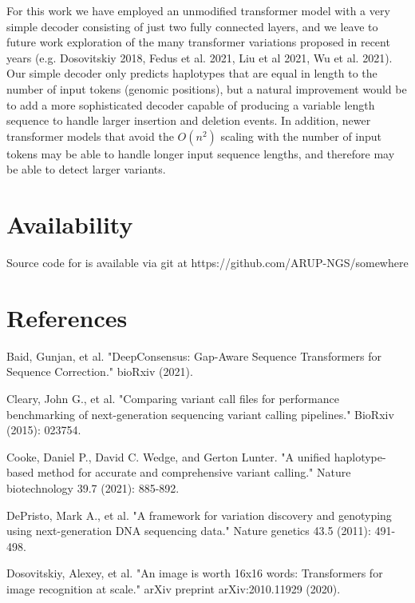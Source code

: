 \documentclass[]{article}
\begin{document}
For this work we have employed an unmodified transformer model with a very simple decoder consisting of just two fully connected layers, and we leave to future work exploration of the many transformer variations proposed in recent years (e.g. Dosovitskiy 2018, Fedus et al. 2021, Liu et al 2021, Wu et al. 2021). Our simple decoder only predicts haplotypes that are equal in length to the number of input tokens (genomic positions), but a natural improvement would be to add a more sophisticated decoder capable of producing a variable length sequence to handle larger insertion and deletion events.  In addition, newer transformer models that avoid the $O(n^2)$ scaling with the number of input tokens may be able to handle longer input sequence lengths, and therefore may be able to detect larger variants. 

\section{Availability}
 
 Source code for is available via git at https://github.com/ARUP-NGS/somewhere
 
\section{References}

\vspace{8pt}
Baid, Gunjan, et al. "DeepConsensus: Gap-Aware Sequence Transformers for Sequence Correction." bioRxiv (2021).

\vspace{8pt}
Cleary, John G., et al. "Comparing variant call files for performance benchmarking of next-generation sequencing variant calling pipelines." BioRxiv (2015): 023754.

\vspace{8pt}
Cooke, Daniel P., David C. Wedge, and Gerton Lunter. "A unified haplotype-based method for accurate and comprehensive variant calling." Nature biotechnology 39.7 (2021): 885-892.

\vspace{8pt}
DePristo, Mark A., et al. "A framework for variation discovery and genotyping using next-generation DNA sequencing data." Nature genetics 43.5 (2011): 491-498.
 
\vspace{8pt}
Dosovitskiy, Alexey, et al. "An image is worth 16x16 words: Transformers for image recognition at scale." arXiv preprint arXiv:2010.11929 (2020).
\end{document}
